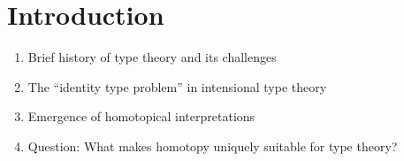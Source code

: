 \section{Introduction}\label{sec:intro}

\begin{enumerate}
    \item Brief history of type theory and its challenges
    \item The ``identity type problem'' in intensional type theory
    \item Emergence of homotopical interpretations
    \item Question: What makes homotopy uniquely suitable for type theory?
\end{enumerate}
